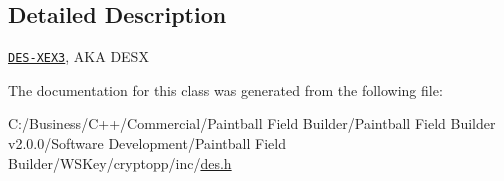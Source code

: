 \subsection{Detailed Description}
\href{http://www.weidai.com/scan-mirror/cs.html#DESX}{\tt DES-\/XEX3}, AKA DESX 

The documentation for this class was generated from the following file:\begin{DoxyCompactItemize}
\item 
C:/Business/C++/Commercial/Paintball Field Builder/Paintball Field Builder v2.0.0/Software Development/Paintball Field Builder/WSKey/cryptopp/inc/\hyperlink{des_8h}{des.h}\end{DoxyCompactItemize}
